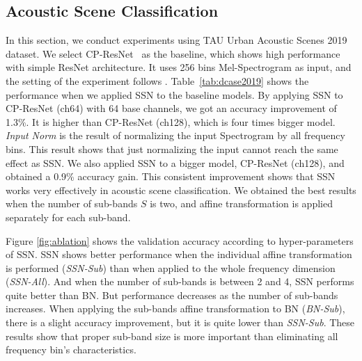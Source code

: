\documentclass{article}
\begin{document}
\subsection{Acoustic Scene Classification}
In this section, we conduct experiments using TAU Urban Acoustic Scenes 2019 dataset. We select CP-ResNet~\cite{koutini2019receptive} as the baseline, which shows high performance with simple ResNet architecture. It uses 256 bins Mel-Spectrogram as input, and the setting of the experiment follows \cite{koutini2019receptive}.
Table~\ref{tab:dcase2019} shows the performance when we applied SSN to the baseline models. By applying SSN to CP-ResNet (ch64) with 64 base channels, we got an accuracy improvement of 1.3\%. It is higher than CP-ResNet (ch128), which is four times bigger model. \textit{Input Norm} is the result of normalizing the input Spectrogram by all frequency bins. This result shows that just normalizing the input cannot reach the same effect as SSN. We also applied SSN to a bigger model, CP-ResNet (ch128), and obtained a 0.9\% accuracy gain. This consistent improvement shows that SSN works very effectively in acoustic scene classification. We obtained the best results when the number of sub-bands $S$ is two, and affine transformation is applied separately for each sub-band.

Figure \ref{fig:ablation} shows the validation accuracy according to hyper-parameters of SSN. SSN shows better performance when the individual affine transformation is performed (\textit{SSN-Sub}) than when applied to the whole frequency dimension (\textit{SSN-All}). And when the number of sub-bands is between 2 and 4, SSN performs quite better than BN. But performance decreases as the number of sub-bands increases. When applying the sub-bands affine transformation to BN (\textit{BN-Sub}), there is a slight accuracy improvement, but it is quite lower than \textit{SSN-Sub}. 
These results show that proper sub-band size is more important than eliminating all frequency bin's characteristics.
\end{document}
